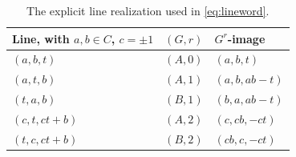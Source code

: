 \begin{table}[tb]
\centering
\begin{tabular}{@{}lll@{}}
\toprule
Line, with $a,b\in C$, $c=\pm1$ & $(G,r)$ & $G^r$-image\\
\midrule
$(a,b,t)$ & $(A,0)$ & $(a,b,t)$\\
$(a,t,b)$ & $(A,1)$ & $(a,b,ab-t)$\\
$(t,a,b)$ & $(B,1)$ & $(b,a,ab-t)$\\
$(c,t,ct+b)$ & $(A,2)$ & $(c,cb,-ct)$\\
$(t,c,ct+b)$ & $(B,2)$ & $(cb,c,-ct)$\\
\bottomrule
\end{tabular}
\caption{The explicit line realization used in \eqref{eq:lineword}.}
\label{tab:realize}
\end{table}
